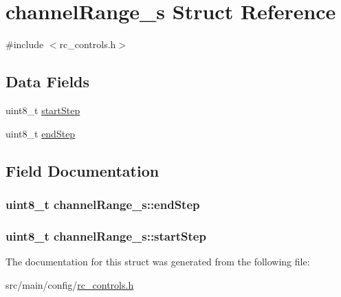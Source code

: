 \hypertarget{structchannelRange__s}{\section{channel\+Range\+\_\+s Struct Reference}
\label{structchannelRange__s}
}


{\ttfamily \#include $<$rc\+\_\+controls.\+h$>$}

\subsection*{Data Fields}
\begin{DoxyCompactItemize}
\item 
uint8\+\_\+t \hyperlink{structchannelRange__s_a7e265e91bde409632ef94a221ad602b6}{start\+Step}
\item 
uint8\+\_\+t \hyperlink{structchannelRange__s_af2c9ba6c1076183b7233ab07faf5a541}{end\+Step}
\end{DoxyCompactItemize}


\subsection{Field Documentation}
\hypertarget{structchannelRange__s_af2c9ba6c1076183b7233ab07faf5a541}{
\subsubsection[{end\+Step}]{\setlength{\rightskip}{0pt plus 5cm}uint8\+\_\+t channel\+Range\+\_\+s\+::end\+Step}}\label{structchannelRange__s_af2c9ba6c1076183b7233ab07faf5a541}
\hypertarget{structchannelRange__s_a7e265e91bde409632ef94a221ad602b6}{
\subsubsection[{start\+Step}]{\setlength{\rightskip}{0pt plus 5cm}uint8\+\_\+t channel\+Range\+\_\+s\+::start\+Step}}\label{structchannelRange__s_a7e265e91bde409632ef94a221ad602b6}


The documentation for this struct was generated from the following file\+:\begin{DoxyCompactItemize}
\item 
src/main/config/\hyperlink{rc__controls_8h}{rc\+\_\+controls.\+h}\end{DoxyCompactItemize}
